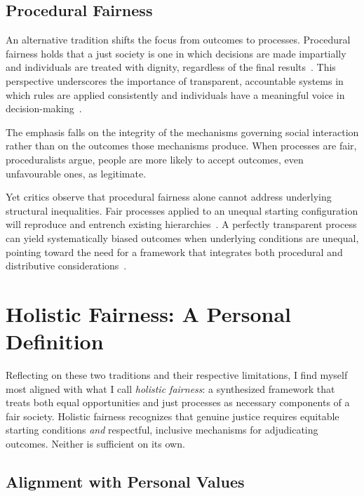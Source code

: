 \documentclass[11pt,showkeys]{../../shared/essay}
\begin{document}
\subsection{Procedural Fairness}

An alternative tradition shifts the focus from outcomes to processes. Procedural fairness holds that a just society is one in which decisions are made impartially and individuals are treated with dignity, regardless of the final results~\cite{dahlstrom_what_nd,mushtaq_basic_2020}. This perspective underscores the importance of transparent, accountable systems in which rules are applied consistently and individuals have a meaningful voice in decision-making~\cite{canada_what_2017}.

The emphasis falls on the integrity of the mechanisms governing social interaction rather than on the outcomes those mechanisms produce. When processes are fair, proceduralists argue, people are more likely to accept outcomes, even unfavourable ones, as legitimate.

Yet critics observe that procedural fairness alone cannot address underlying structural inequalities. Fair processes applied to an unequal starting configuration will reproduce and entrench existing hierarchies~\cite{macdonald_judicial_1980,galligan_procedural_1997}. A perfectly transparent process can yield systematically biased outcomes when underlying conditions are unequal, pointing toward the need for a framework that integrates both procedural and distributive considerations~\cite{ferguson_procedural_2014,rescher_review_2003,morse_ends_2022}.

\section{Holistic Fairness: A Personal Definition}

Reflecting on these two traditions and their respective limitations, I find myself most aligned with what I call \textit{holistic fairness}: a synthesized framework that treats both equal opportunities and just processes as necessary components of a fair society. Holistic fairness recognizes that genuine justice requires equitable starting conditions \textit{and} respectful, inclusive mechanisms for adjudicating outcomes. Neither is sufficient on its own.

\subsection{Alignment with Personal Values}
\end{document}
